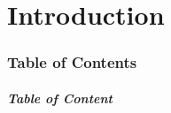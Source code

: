 \part{Introduction}
\label{part:intro}

\section*{Table of Contents}
\begin{frame}[c]
	\frametitle{Table of Content}
	\tableofcontents
	
\end{frame}




